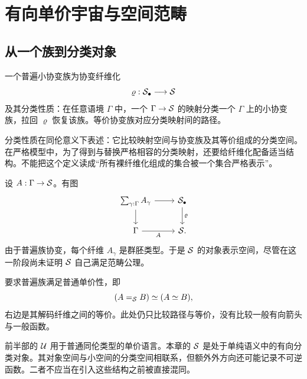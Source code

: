 \chapter{有向单价宇宙与空间范畴}
\section{从一个族到分类对象}
\begin{definition}[普遍协变族]
一个普遍小协变族为协变纤维化
\[
\varrho:\mathcal S_\bullet\longrightarrow\mathcal S
\]
及其分类性质：在任意语境 $\Gamma$ 中，一个 $\Gamma\to\mathcal S$ 的映射分类一个 $\Gamma$ 上的小协变族，拉回 $\varrho$ 恢复该族。等价协变族对应分类映射间的路径。
\end{definition}
\begin{remark}
分类性质在同伦意义下表述：它比较映射空间与协变族及其等价组成的分类空间。在严格模型中，为了得到与替换严格相容的分类映射，还要给纤维化配备适当结构。不能把这个定义读成“所有裸纤维化组成的集合被一个集合严格表示”。
\end{remark}
\begin{example}[分类拉回图]
设 $A:\Gamma\to\mathcal S$。有图
\[
\begin{tikzcd}
\sum_{\gamma:\Gamma}A_\gamma\ar[r]\ar[d]&\Sp_\bullet\ar[d,"\varrho"]\\
\Gamma\ar[r,"A"']&\Sp.
\end{tikzcd}
\]
由于普遍族协变，每个纤维 $A_\gamma$ 是群胚类型。于是 $\mathcal S$ 的对象表示空间，尽管在这一阶段尚未证明 $\mathcal S$ 自己满足范畴公理。
\end{example}
\begin{definition}[普遍族的普通单价性]
要求普遍族满足普通单价性，即
\[
(A=_\mathcal S B)\simeq(A\simeq B),
\]
右边是其解码纤维之间的等价。此处仍只比较路径与等价，没有比较一般有向箭头与一般函数。
\end{definition}
\begin{remark}
前半部的 $\mathcal U$ 用于普通同伦类型的单价语言。本章的 $\mathcal S$ 是处于单纯语义中的有向分类对象。其对象空间与小空间的分类空间相联系，但额外外方向还可能记录不可逆函数。二者不应当在引入这些结构之前被直接混同。
\end{remark}

